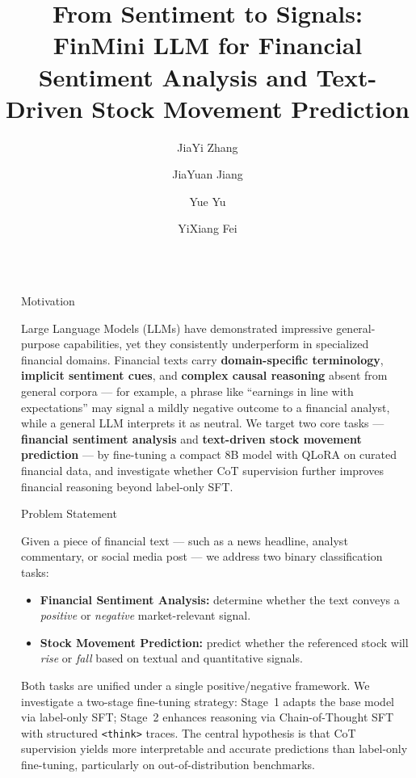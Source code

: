 \documentclass[final]{beamer}
\title{From Sentiment to Signals: FinMini LLM for Financial Sentiment Analysis and Text-Driven Stock Movement Prediction}
\author{JiaYi Zhang \and JiaYuan Jiang \and Yue Yu \and YiXiang Fei}
\institute[UMich]{Electrical Engineering and Computer Science, University of Michigan \quad $\cdot$ \quad EECS 545: Machine Learning}
\newlength{\sepwidth}
\newlength{\colwidth}
\newcommand{\separatorcolumn}{\begin{column}{\sepwidth}\end{column}}
\begin{document}
\begin{frame}[t]
\begin{columns}[t]
\separatorcolumn

\begin{column}{\colwidth}

  \begin{block}{Motivation}

    Large Language Models (LLMs) have demonstrated impressive general-purpose
    capabilities, yet they consistently underperform in specialized financial
    domains. Financial texts carry \textbf{domain-specific terminology},
    \textbf{implicit sentiment cues}, and \textbf{complex causal reasoning}
    absent from general corpora --- for example, a phrase like
    ``earnings in line with expectations'' may signal a mildly negative
    outcome to a financial analyst, while a general LLM interprets it as
    neutral. We target two core tasks --- \textbf{financial sentiment
    analysis} and \textbf{text-driven stock movement prediction} --- by
    fine-tuning a compact 8B model with QLoRA on curated financial data,
    and investigate whether CoT supervision further improves financial
    reasoning beyond label-only SFT.

  \end{block}

  \begin{block}{Problem Statement}

    Given a piece of financial text --- such as a news headline, analyst
    commentary, or social media post --- we address two binary
    classification tasks:

    \begin{itemize}
      \item \textbf{Financial Sentiment Analysis:} determine whether the
        text conveys a \emph{positive} or \emph{negative} market-relevant
        signal.
      \item \textbf{Stock Movement Prediction:} predict whether the
        referenced stock will \emph{rise} or \emph{fall} based on textual
        and quantitative signals.
    \end{itemize}

    Both tasks are unified under a single positive/negative framework.
    We investigate a two-stage fine-tuning strategy: Stage~1 adapts the
    base model via label-only SFT; Stage~2 enhances reasoning via
    Chain-of-Thought SFT with structured \texttt{<think>} traces.
    The central hypothesis is that CoT supervision yields more
    interpretable and accurate predictions than label-only fine-tuning,
    particularly on out-of-distribution benchmarks.


\end{block}
\end{column}
\end{columns}
\end{frame}
\end{document}
